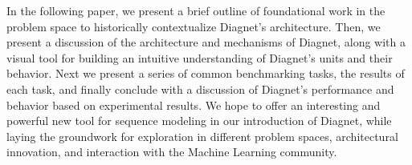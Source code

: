 \documentclass{article}
\begin{document}
In the following paper, we present a brief outline of foundational work in the problem space to historically contextualize Diagnet’s architecture.  Then, we present a discussion of the architecture and mechanisms of Diagnet, along with a visual tool for building an intuitive understanding of Diagnet’s units and their behavior.  Next we present a series of common benchmarking tasks, the results of each task, and finally conclude with a discussion of Diagnet’s performance and behavior based on experimental results.  We hope to offer an interesting and powerful new tool for sequence modeling in our introduction of Diagnet, while laying the groundwork for exploration in different problem spaces, architectural innovation, and interaction with the Machine Learning community.

%
%
%
\end{document}

